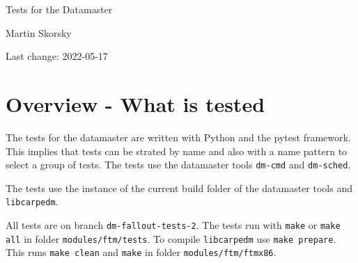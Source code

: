 \documentclass[12pt,a4paper]{report}
\begin{document}
\begin{titlepage}
\vspace{2cm}
\begin{center}
\Huge{Tests for the Datamaster}

\Large{Martin Skorsky}

\Large{Last change: 2022-05-17}
\end{center}
\vfill
\end{titlepage}

\tableofcontents

\chapter{Overview - What is tested}
The tests for the datamaster are written with Python and the pytest framework. This implies that tests can be strated
by name and also with a name pattern to select a group of tests. The tests use the datamaster tools \texttt{dm-cmd}
and \texttt{dm-sched}.

The tests use the instance of the current build folder of the datamaster tools and \texttt{libcarpedm}.

All tests are on branch \texttt{dm-fallout-tests-2}. The tests run with \texttt{make} or \texttt{make all} in folder \texttt{modules/ftm/tests}.
To compile \texttt{libcarpedm} use \texttt{make prepare}. This runs \texttt{make clean} and \texttt{make} in folder \texttt{modules/ftm/ftmx86}.
\end{document}
